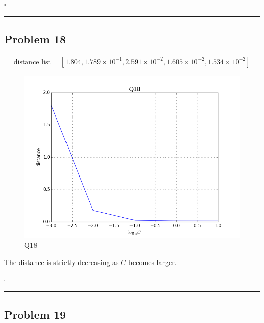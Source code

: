 \documentclass[12pt]{article}
\newcommand*{\QEDB}{\hfill\ensuremath{\square}}
\newcommand{\SBrackets}[1]{\left[#1\right]}
\newcommand{\SciNum}[2]{#1\times{10}^{#2}}
\newcommand{\horrule}[1]{\rule{\linewidth}{#1}}
\begin{document}
\QEDB

\horrule{0.5pt}

\subsection*{Problem 18}

\begin{align}
\text{distance list}=\SBrackets{1.804, \SciNum{1.789}{-1}, \SciNum{2.591}{-2}, \SciNum{1.605}{-2}, \SciNum{1.534}{-2}}
\end{align}
\begin{figure}[H]
	\centering
	\includegraphics[scale=0.5]{Q18.png}
	\caption{Q18}
	\label{Q18}
\end{figure}
The distance is strictly decreasing as $C$ becomes larger.

\QEDB

\horrule{0.5pt}

\subsection*{Problem 19}
\end{document}
